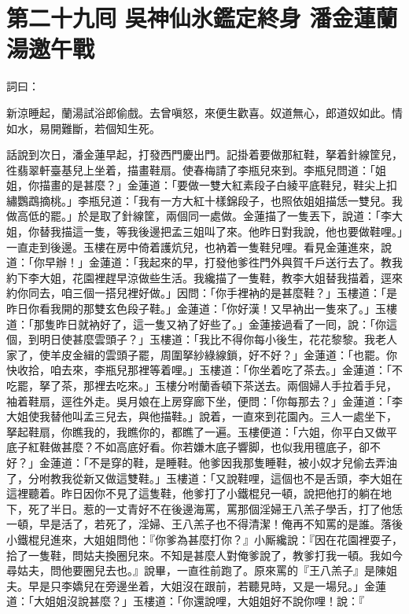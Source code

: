 
\chapter*{第二十九囘 吳神仙氷鑑定終身 潘金蓮蘭湯邀午戰}


詞曰：

\begin{myquote}
新涼睡起，蘭湯試浴郎偷戲。去曾嗔怒，來便生歡喜。奴道無心，郎道奴如此。情如水，易開難斷，若個知生死。

\end{myquote}

話說到次日，潘金蓮早起，打發西門慶出門。記掛着要做那紅鞋，{}拏着針線筐兒，徃翡翠軒臺基兒上坐着，描畫鞋扇。使春梅請了李瓶兒來到。李瓶兒問道：「姐姐，你描畫的是甚麼？」金蓮道：「要做一雙大紅素段子白綾平底鞋兒，鞋尖上扣繡鸚鵡摘桃。」李瓶兒道：「我有一方大紅十樣錦段子，也照依姐姐描恁一雙兒。我做高低的罷。」於是取了針線筐，兩個同一處做。金蓮描了一隻丟下，說道：「李大姐，你替我描這一隻，等我後邊把孟三姐叫了來。他昨日對我說，他也要做鞋哩。」一直走到後邊。玉樓在房中倚着護炕兒，也衲着一隻鞋兒哩。看見金蓮進來，說道：「你早辦！」金蓮道：「我起來的早，打發他爹徃門外與賀千戶送行去了。教我約下李大姐，花園裡趕早涼做些生活。我纔描了一隻鞋，教李大姐替我描着，逕來約你同去，咱三個一搭兒裡好做。」因問：「你手裡衲的是甚麼鞋？」玉樓道：「是昨日你看我開的那雙玄色段子鞋。」金蓮道：「你好漢！又早衲出一隻來了。」玉樓道：「那隻昨日就衲好了，這一隻又衲了好些了。」金蓮接過看了一囘，說：「你這個，到明日使甚麼雲頭子？」玉樓道：「我比不得你每小後生，花花黎黎。{}我老人家了，使羊皮金緝的雲頭子罷，周圍拏紗綠線鎖，好不好？」金蓮道：「也罷。你快收拾，咱去來，李瓶兒那裡等着哩。」玉樓道：「你坐着吃了茶去。」金蓮道：「不吃罷，拏了茶，那裡去吃來。」玉樓分咐蘭香頓下茶送去。兩個婦人手拉着手兒，袖着鞋扇，逕徃外走。吳月娘在上房穿廊下坐，便問：「你每那去？」金蓮道：「李大姐使我替他叫孟三兒去，與他描鞋。」{}說着，一直來到花園內。三人一處坐下，拏起鞋扇，你瞧我的，我瞧你的，{}都瞧了一遍。玉樓便道：「六姐，你平白又做平底子紅鞋做甚麼？不如高底好看。你若嫌木底子響脚，也似我用氊底子，卻不好？」{}金蓮道：「不是穿的鞋，是睡鞋。他爹因我那隻睡鞋，被小奴才兒偷去弄油了，分咐教我從新又做這雙鞋。」玉樓道：「又說鞋哩，這個也不是舌頭，李大姐在這裡聽着。昨日因你不見了這隻鞋，他爹打了小鐵棍兒一頓，說把他打的躺在地下，死了半日。惹的一丈青好不在後邊海罵，罵那個淫婦王八羔子學舌，打了他恁一頓，早是活了，若死了，淫婦、王八羔子也不得清潔！俺再不知罵的是誰。落後小鐵棍兒進來，大姐姐問他：『你爹為甚麼打你？』小厮纔說：『因在花園裡耍子，拾了一隻鞋，問姑夫換圈兒來。不知是甚麼人對俺爹說了，教爹打我一頓。我如今尋姑夫，問他要圈兒去也。』說畢，一直徃前跑了。原來罵的『王八羔子』是陳姐夫。{}早是只李嬌兒在旁邊坐着，大姐沒在跟前，若聽見時，又是一場兒。」金蓮道：「大姐姐沒說甚麼？」玉樓道：「你還說哩，大姐姐好不說你哩！說：『